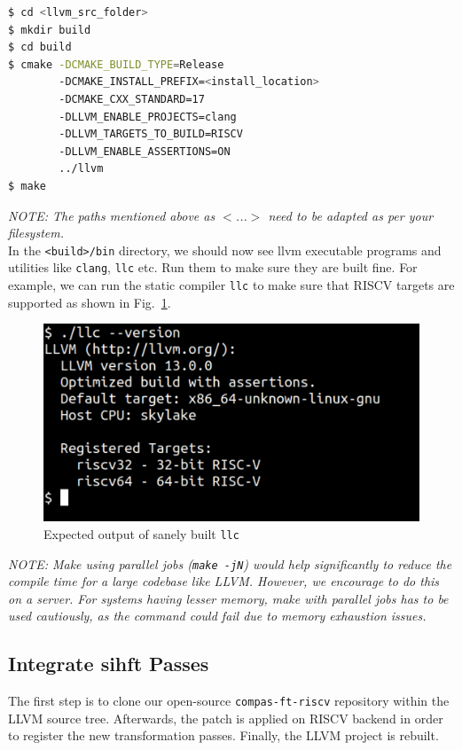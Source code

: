 \begin{framed}
 \begin{lstlisting}[language=bash, basicstyle=\small\ttfamily]
$ cd <llvm_src_folder>
$ mkdir build
$ cd build
$ cmake -DCMAKE_BUILD_TYPE=Release
        -DCMAKE_INSTALL_PREFIX=<install_location>
        -DCMAKE_CXX_STANDARD=17
        -DLLVM_ENABLE_PROJECTS=clang
        -DLLVM_TARGETS_TO_BUILD=RISCV
        -DLLVM_ENABLE_ASSERTIONS=ON
        ../llvm
$ make
  \end{lstlisting}
\end{framed}

\textit{NOTE: The paths mentioned above as $<$...$>$ need to be adapted as per your filesystem.} \\

In the \texttt{<build>/bin} directory, we should now see llvm executable programs and utilities like
\texttt{clang}, \texttt{llc} etc. Run them to make sure they are built fine. For example, we can run the
static compiler \texttt{llc} to make sure that RISCV targets are supported as shown in Fig.~\ref{fig:llc}. \\

\begin{figure}[htb]
 \centering
 \includegraphics[width=0.8\linewidth]{figs/llc.pdf}
 \caption{Expected output of sanely built \texttt{llc}}
 \label{fig:llc}
\end{figure}

\textit{NOTE: Make using parallel jobs (\texttt{make -jN}) would help significantly to reduce the compile time
 for a large codebase like LLVM. However, we encourage to do this on a server. For systems having lesser memory, make
 with parallel jobs has to be used cautiously, as the command could fail due to memory exhaustion issues.}

\subsection{Integrate \ac{sihft} Passes}
The first step is to clone our open-source \texttt{compas-ft-riscv} repository within the LLVM source tree. Afterwards,
the patch is applied on RISCV backend in order to register the new transformation passes. Finally, the LLVM project
is rebuilt.

